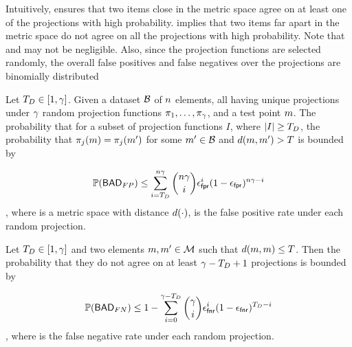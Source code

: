 Intuitively,  ensures that two items close in the metric space agree on at least one of the projections 
with high probability.  implies that two items far apart in the metric space do not agree on all the projections 
with high probability. Note that \fpr and \fnr may not be negligible. Also, since the projection functions are selected randomly, the overall false positives and false negatives over the projections are binomially distributed 

\newcommand{\badFP}{\ensuremath{\mathsf{BAD}_{FP}}\xspace}
\newcommand{\badFN}{\ensuremath{\mathsf{BAD}_{FN}}\xspace}
\begin{corollary}
 \label{eq:false_pos_bound} 
Let $T_{D} \in [1, \gamma]$. Given a dataset $\blocklist$ of $n$ elements, all having unique projections under $\gamma$ random projection functions $\projFn[1], \dots, \projFn[\numProjections]$, and a  test point $\genericMetricSpaceElmt$. The probability that for a subset of projection functions $I$, where $\left|{I}\right| \ge T_{D}$, the probability that $\projFn[\projIdx](\genericMetricSpaceElmt) = \projFn[\projIdx](\genericMetricSpaceElmt')$ for some $\genericMetricSpaceElmt' \in \blocklist$ and $\distanceNotation[\distance][\genericMetricSpaceElmt][\genericMetricSpaceElmtAlt] > 
			\threshold$ is bounded by 


\[			 \prob{\badFP}
 \le \sum\limits_{i = \detectionThreshold}^{\blocklistSize \numProjections} \binom{\blocklistSize\numProjections}{i} \fpr^{i} (1 - \fpr)^{\blocklistSize \numProjections - i}
\]
, where  \metricSpace is a metric space with distance $\distanceNotation[\distance][\cdot]$, \fpr is the false positive rate under each random projection.
\end{corollary}


\begin{corollary}
 \label{eq:false_neg_bound}
Let $T_{D} \in [1, \gamma]$ and two elements $\genericMetricSpaceElmt, \genericMetricSpaceElmtAlt \in \metricSpace$ such that $\hammingDist{\genericMetricSpaceElmt}{\genericMetricSpaceElmt} \le \threshold$. Then the probability that they do not agree on at least $\gamma - T_{D} + 1$ projections is bounded by 

\[	
\prob{\badFN} \le 1 - \sum\limits_{i = 0}^{\numProjections - \detectionThreshold} \binom{\numProjections}{i} \fnr^{i} (1 - \fnr)^{\detectionThreshold - i}
\]
, where \fnr is the false negative rate under each random projection.

\end{corollary}


